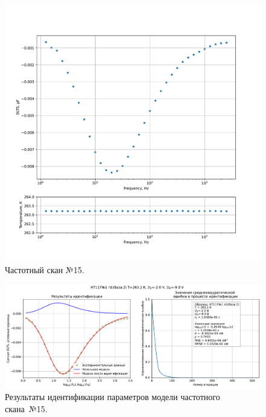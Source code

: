 \begin{figure}[!ht]
    \centering
    \includegraphics[width=1\textwidth]{../plots/КТ117№1_п1(база 2)_2500Гц-1Гц_1пФ_-10С_-2В-9В_100мВ_20мкс_шаг_0,1.pdf}
    \caption{Частотный скан №15.}
    \label{pic:frequency_scan_15}
\end{figure}

\begin{figure}[!ht]
    \centering
    \includegraphics[width=1\textwidth]{../plots/КТ117№1_п1(база 2)_2500Гц-1Гц_1пФ_-10С_-2В-9В_100мВ_20мкс_шаг_0,1_model.pdf}
    \caption{Результаты идентификации параметров модели частотного скана~№15.}
    \label{pic:frequency_scan_model15}
\end{figure}

\pagebreak


